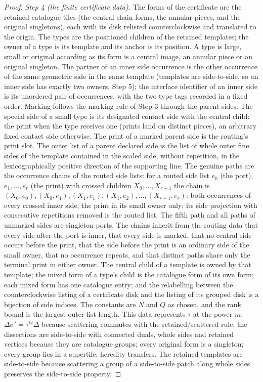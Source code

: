 \documentclass[11pt,a4paper]{article}
\theoremstyle{remark}
\begin{document}
\begin{proof}
\emph{Step 4 (the finite certificate data).}  The forms of the certificate
are the retained catalogue tiles (the central chain forms, the annular
pieces, and the original singletons), each with its disk relisted
counterclockwise and translated to the origin.  The types are the positioned
children of the retained templates; the owner of a type is its template and
its anchor is its position.  A type is large, small or original according as
its form is a central image, an annular piece or an original singleton.  The
partner of an inner side occurrence is the other occurrence of the same
geometric side in the same template (templates are side-to-side, so an inner
side has exactly two owners, Step 5); the interface identifier of an inner
side is its unordered pair of occurrences, with the two type tags recorded in
a fixed order.  Marking follows the marking rule of Step 3 through the parent
sides.  The special side of a small type is its designated contact side with
the central child: the print when the type receives one (prints land on
distinct pieces), an arbitrary fixed contact side otherwise.  The print of a
marked parent side is the routing's print slot.  The outer list of a parent
declared side is the list of whole outer fine sides of the template contained
in the scaled side, without repetition, in the lexicographically positive
direction of the supporting line.  The genuine paths are the occurrence
chains of the routed side lists: for a routed side list $e_0$ (the port),
$e_1,\dots,e_r$ (the print) with crossed children $X_0,\dots,X_{r-1}$ the
chain is $(X_0,e_0),(X_0,e_1),(X_1,e_1),(X_1,e_2),\dots,(X_{r-1},e_r)$: both
occurrences of every crossed inner side, the print in its small owner only;
its side projection with consecutive repetitions removed is the routed list.
The fifth path and all paths of unmarked sides are singleton ports.  The
chains inherit from the routing data that every side after the port is
inner, that every side is marked, that no central side occurs before the
print, that the side before the print is an ordinary side of the small
owner, that no occurrence repeats, and that distinct paths share only the
terminal print in either owner.  The central child of a template is owned
by that template; the mixed form of a type's child is the catalogue form of
its own form; each mixed form has one catalogue entry; and the relabelling
between the counterclockwise listing of a certificate disk and the listing
of its grouped disk is a bijection of side indices.  The
constants are $N$ and $Q$ as chosen, and the rank bound is the largest outer
list length.  This data represents $\tau$ at the power $m$: $\Delta\sigma'=
\tau^{kl}\Delta$ because scattering commutes with the retained/scattered rule;
the dissections are side-to-side with connected duals, whole sides and
retained vertices because they are catalogue groups; every original form is a
singleton; every group lies in a supertile; heredity transfers.  The retained
templates are side-to-side because scattering a group of a side-to-side patch
along whole sides preserves the side-to-side property.


\end{proof}
\end{document}
